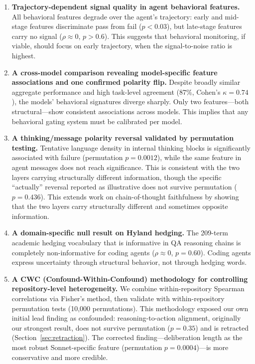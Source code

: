 \documentclass[11pt]{article}
\begin{document}
\begin{enumerate}[leftmargin=*]
\item \textbf{Trajectory-dependent signal quality in agent behavioral features.}
All behavioral features degrade over the agent's trajectory: early and mid-stage features discriminate pass from fail ($p < 0.03$), but late-stage features carry no signal ($\rho \approx 0$, $p > 0.6$).
This suggests that behavioral monitoring, if viable, should focus on early trajectory, when the signal-to-noise ratio is highest.

\item \textbf{A cross-model comparison revealing model-specific feature associations and one confirmed polarity flip.}
Despite broadly similar aggregate performance and high task-level agreement (87\%, Cohen's $\kappa = 0.74$), the models' behavioral signatures diverge sharply.
Only two features---both structural---show consistent associations across models.
This implies that any behavioral gating system must be calibrated per model.

\item \textbf{A thinking/message polarity reversal validated by permutation testing.}
Tentative language density in internal thinking blocks is significantly associated with failure (permutation $p = 0.0012$), while the same feature in agent messages does not reach significance.
This is consistent with the two layers carrying structurally different information, though the specific ``actually'' reversal reported as illustrative does not survive permutation ($p = 0.436$).
This extends work on chain-of-thought faithfulness \citep{arcuschin2025cot} by showing that the two layers carry structurally different and sometimes opposite information.

\item \textbf{A domain-specific null result on Hyland hedging.}
The 209-term academic hedging vocabulary \citep{hyland2005metadiscourse} that is informative in QA reasoning chains is completely non-informative for coding agents ($\rho \approx 0$, $p = 0.60$).
Coding agents express uncertainty through structural behavior, not through hedging words.

\item \textbf{A CWC (Confound-Within-Confound) methodology for controlling repository-level heterogeneity.}
We combine within-repository Spearman correlations via Fisher's method, then validate with within-repository permutation tests (10,000 permutations).
This methodology exposed our own initial lead finding as confounded: reasoning-to-action alignment, originally our strongest result, does not survive permutation ($p = 0.35$) and is retracted (Section~\ref{sec:retraction}).
The corrected finding---deliberation length as the most robust Sonnet-specific feature (permutation $p = 0.0004$)---is more conservative and more credible.
\end{enumerate}
\end{document}
